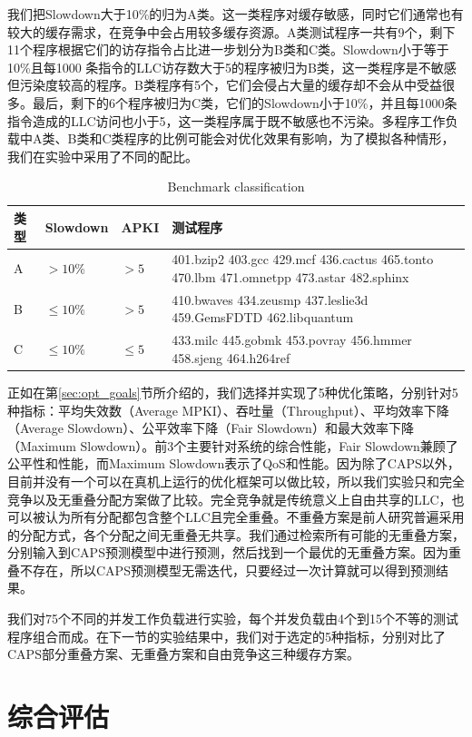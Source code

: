 我们把Slowdown大于10\%的归为A类。这一类程序对缓存敏感，同时它们通常也有较大的缓存需求，在竞争中会占用较多缓存资源。A类测试程序一共有9个，剩下11个程序根据它们的访存指令占比进一步划分为B类和C类。Slowdown小于等于10\%且每1000 条指令的LLC访存数大于5的程序被归为B类，这一类程序是不敏感但污染度较高的程序。B类程序有5个，它们会侵占大量的缓存却不会从中受益很多。最后，剩下的6个程序被归为C类，它们的Slowdown小于10\%，并且每1000条指令造成的LLC访问也小于5，这一类程序属于既不敏感也不污染。多程序工作负载中A类、B类和C类程序的比例可能会对优化效果有影响，为了模拟各种情形，我们在实验中采用了不同的配比。

\begin{table}[htbp]
\caption{Benchmark classification}
\label{tab:benchmarks}
\centering
\begin{tabularx} {1\textwidth}{|l|l|l|X| } 
 \hline
 类型 & Slowdown & APKI & 测试程序 \\
 \hline
 A & $> 10\%$ & $> 5$ & 401.bzip2 403.gcc 429.mcf 436.cactus 465.tonto 470.lbm 471.omnetpp 473.astar 482.sphinx\\ 
 \hline
 B & $\leq 10\%$ & $> 5$ & 410.bwaves 434.zeusmp 437.leslie3d 459.GemsFDTD 462.libquantum\\ 
 \hline
 C & $\leq 10\%$ & $\leq 5$ & 433.milc 445.gobmk 453.povray 456.hmmer 458.sjeng 464.h264ref\\
 \hline 
\end{tabularx}
\end{table}

正如在第\ref{sec:opt_goals}节所介绍的，我们选择并实现了5种优化策略，分别针对5种指标：平均失效数（Average MPKI）、吞吐量（Throughput）、平均效率下降（Average Slowdown）、公平效率下降（Fair Slowdown）和最大效率下降（Maximum Slowdown）。前3个主要针对系统的综合性能，Fair Slowdown兼顾了公平性和性能，而Maximum Slowdown表示了QoS和性能。因为除了CAPS以外，目前并没有一个可以在真机上运行的优化框架可以做比较，所以我们实验只和完全竞争以及无重叠分配方案做了比较。完全竞争就是传统意义上自由共享的LLC，也可以被认为所有分配都包含整个LLC且完全重叠。不重叠方案是前人研究普遍采用的分配方式，各个分配之间无重叠无共享。我们通过检索所有可能的无重叠方案，分别输入到CAPS预测模型中进行预测，然后找到一个最优的无重叠方案。因为重叠不存在，所以CAPS预测模型无需迭代，只要经过一次计算就可以得到预测结果。

我们对75个不同的并发工作负载进行实验，每个并发负载由4个到15个不等的测试程序组合而成。在下一节的实验结果中，我们对于选定的5种指标，分别对比了CAPS部分重叠方案、无重叠方案和自由竞争这三种缓存方案。

\section{综合评估}

